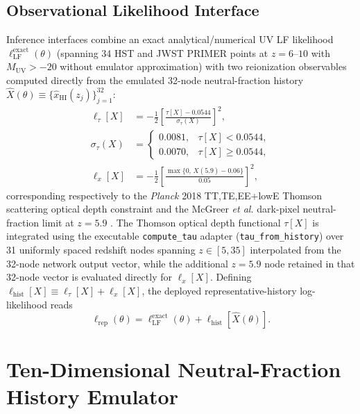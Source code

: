 \documentclass[aps,prd,reprint,superscriptaddress,nofootinbib,amsmath,amssymb,floatfix,longbibliography]{revtex4-2}
\begin{document}
\subsection{Observational Likelihood Interface}\label{sec:likelihood}

Inference interfaces combine an exact analytical/numerical UV LF likelihood $\ell_{\mathrm{LF}}^{\mathrm{exact}}(\theta)$ (spanning 34 HST \cite{Bouwens2015,Bouwens2017} and JWST \textsc{PRIMER} \cite{Donnan2024} points at $z=6\text{--}10$ with $M_{\mathrm{UV}} > -20$ without emulator approximation) with two reionization observables computed directly from the emulated 32-node neutral-fraction history $\widehat{X}(\theta) \equiv \{\widehat{x}_{\mathrm{HI}}(z_j)\}_{j=1}^{32}$:
\begin{align}
\ell_{\tau}[X] &= -\frac{1}{2}\left[\frac{\tau[X] - 0.0544}{\sigma_{\tau}(X)}\right]^2,\nonumber\\
\sigma_\tau(X) &= \begin{cases} 0.0081, & \tau[X] < 0.0544,\\ 0.0070, & \tau[X] \ge 0.0544, \end{cases}\\
\ell_x[X] &= -\frac{1}{2}\left[\frac{\max\{0,\, X(5.9) - 0.06\}}{0.05}\right]^2,
\end{align}
corresponding respectively to the \textit{Planck} 2018 TT,TE,EE+lowE Thomson scattering optical depth constraint \cite{Planck2018} and the McGreer \textit{et al.} dark-pixel neutral-fraction limit at $z=5.9$ \cite{McGreer2015}. The Thomson optical depth functional $\tau[X]$ is integrated using the executable \texttt{compute\_tau} adapter (\texttt{tau\_from\_history}) over 31 uniformly spaced redshift nodes spanning $z \in [5, 35]$ interpolated from the 32-node network output vector, while the additional $z=5.9$ node retained in that 32-node vector is evaluated directly for $\ell_x[X]$. Defining $\ell_{\mathrm{hist}}[X] \equiv \ell_{\tau}[X] + \ell_x[X]$, the deployed representative-history log-likelihood reads
\begin{equation}
\ell_{\mathrm{rep}}(\theta) = \ell_{\mathrm{LF}}^{\mathrm{exact}}(\theta) + \ell_{\mathrm{hist}}[\widehat{X}(\theta)].
\label{eq:lrep}
\end{equation}

\section{Ten-Dimensional Neutral-Fraction History Emulator}\label{sec:history}
\end{document}
